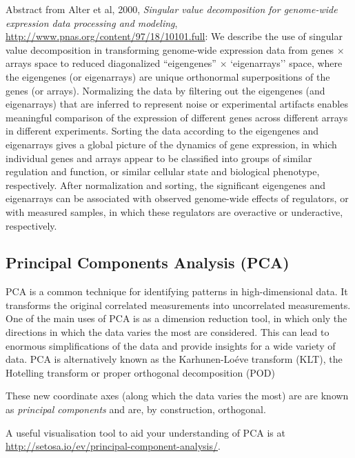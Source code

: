 Abstract from Alter et al, 2000, {\em Singular value decomposition for genome-wide expression data processing and modeling},  \url{http://www.pnas.org/content/97/18/10101.full}: We describe the use of singular value decomposition in transforming genome-wide expression data from genes $\times$ arrays space to reduced diagonalized ``eigengenes'' $\times$ `eigenarrays'' space, where the eigengenes (or eigenarrays) are unique orthonormal superpositions of the genes (or arrays). Normalizing the data by filtering out the eigengenes (and eigenarrays) that are inferred to represent noise or experimental artifacts enables meaningful comparison of the expression of different genes across different arrays in different experiments. Sorting the data according to the eigengenes and eigenarrays gives a global picture of the dynamics of gene expression, in which individual genes and arrays appear to be classified into groups of similar regulation and function, or similar cellular state and biological phenotype, respectively. After normalization and sorting, the significant eigengenes and eigenarrays can be associated with observed genome-wide effects of regulators, or with measured samples, in which these regulators are overactive or underactive, respectively. 

%
%
%


\subsection{Principal Components Analysis (PCA)}



PCA is a common technique for identifying patterns in high-dimensional data.  It  transforms   the original correlated measurements into uncorrelated measurements.
 One of the main uses of PCA is as a dimension reduction tool, in which only the directions in which the data varies the most are considered.  This can lead to enormous simplifications of the data and provide insights for a wide variety of data.   PCA is alternatively known as  the Karhunen-Lo\'eve transform (KLT), the Hotelling transform or proper orthogonal decomposition (POD)
 
 These new coordinate axes (along which the data varies the most) are are known as {\em principal components} and are, by construction, orthogonal.

 A useful visualisation tool to aid your understanding of PCA is at \href{http://setosa.io/ev/principal-component-analysis/}{http://setosa.io/ev/principal-component-analysis/}.


